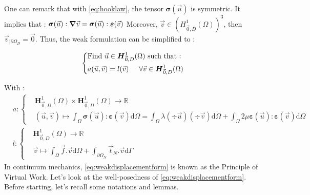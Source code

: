 \documentclass[a4paper,12pt,twoside]{report}
\newcommand{\mtr}{\mathbb{R}}
\newcommand{\dif}{\mathrm{d}}
\begin{document}
One can remark that with \eqref{eq:hooklaw}, the tensor $\boldsymbol \sigma (\vec u)$ is symmetric. It implies that : 
$\boldsymbol \sigma (\vec u) : \grad \vec v = \boldsymbol \sigma(\vec u) : \boldsymbol \varepsilon (\vec v)$
Moreover, $\vec v \in \left(H^1_{\vec 0,D}(\Omega) \right)^3$, then $\vec v_{|\partial\Omega_D} = \vec 0$. Thus, the weak formulation can be simplified to : 

\begin{tcolorbox}
\begin{equation}
\label{eq:weakdisplacementform}
\left\{
    \begin{aligned}
    &\text{Find } \vec u \in \boldsymbol H^1_{\vec 0,D}(\Omega) \text{ such that :}\\
    & a(\vec u,\vec v) = l(\vec v) \hspace{0.5cm} \forall \vec v \in \boldsymbol H^1_{\vec 0,D}(\Omega)
    \end{aligned}
\right.
\end{equation}
\end{tcolorbox}




With : 
\begin{equation*}
    \begin{aligned}
        & a : \left\{
        \begin{aligned}
            &\boldsymbol H^1_{\vec 0,D}(\Omega) \times \boldsymbol H^1_{\vec 0,D}(\Omega)  \rightarrow \mtr \\
            &(\vec u,\vec v)  \longmapsto \int_\Omega \boldsymbol \sigma(\vec u) : \boldsymbol \varepsilon (\vec v) \dif \Omega = \int_\Omega \lambda (\div \vec u) (\div \vec v) \dif \Omega+ \int_\Omega 2\mu \boldsymbol \varepsilon(\vec u): \boldsymbol \varepsilon (\vec v)\dif \Omega
        \end{aligned}
        \right. \\
    	& l : \left\{
        \begin{aligned}
            &\boldsymbol H^1_{\vec 0,D}(\Omega) \rightarrow \mtr \\
            &\vec v \longmapsto \int_\Omega \vec f . \vec v \dif \Omega + \int_{\partial\Omega_N} \vec t_N.\vec v \dif \Gamma
        \end{aligned}
        \right.
    \end{aligned}
\end{equation*}
In continuum mechanics, \eqref{eq:weakdisplacementform} is known as the Principle of Virtual Work. Let's look at the well-posedness of \eqref{eq:weakdisplacementform}. Before starting, let's recall some notations and lemmas. \\
\end{document}
